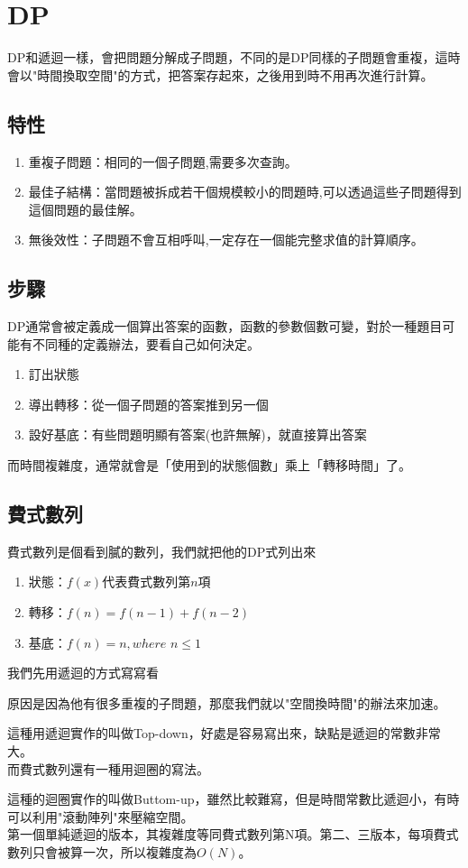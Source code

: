 \section{DP}
DP和遞迴一樣，會把問題分解成子問題，不同的是DP同樣的子問題會重複，這時會以"時間換取空間"的方式，把答案存起來，之後用到時不用再次進行計算。
\subsection{特性}
\begin{enumerate}
\item 重複子問題：相同的一個子問題,需要多次查詢。
\item 最佳子結構：當問題被拆成若干個規模較小的問題時,可以透過這些子問題得到這個問題的最佳解。
\item 無後效性：子問題不會互相呼叫,一定存在一個能完整求值的計算順序。
\end{enumerate}
\subsection{步驟}
DP通常會被定義成一個算出答案的函數，函數的參數個數可變，對於一種題目可能有不同種的定義辦法，要看自己如何決定。
\begin{enumerate}
\item 訂出狀態
\item 導出轉移：從一個子問題的答案推到另一個
\item 設好基底：有些問題明顯有答案(也許無解)，就直接算出答案
\end{enumerate}
而時間複雜度，通常就會是「使用到的狀態個數」乘上「轉移時間」了。
\subsection{費式數列}
費式數列是個看到膩的數列，我們就把他的DP式列出來
\begin{enumerate}
\item 狀態：$f(x)$代表費式數列第$n$項
\item 轉移：$f(n)=f(n-1)+f(n-2)$
\item 基底：$f(n)=n,where$ $n\leq 1$
\end{enumerate}
我們先用遞迴的方式寫寫看

原因是因為他有很多重複的子問題，那麼我們就以"空間換時間"的辦法來加速。

這種用遞迴實作的叫做Top-down，好處是容易寫出來，缺點是遞迴的常數非常大。\\
而費式數列還有一種用迴圈的寫法。

這種的迴圈實作的叫做Buttom-up，雖然比較難寫，但是時間常數比遞迴小，有時可以利用"滾動陣列"來壓縮空間。\\
第一個單純遞迴的版本，其複雜度等同費式數列第N項。第二、三版本，每項費式數列只會被算一次，所以複雜度為$O(N)$。
